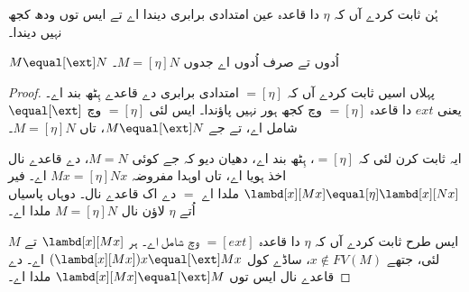 \documentclass[../../../include/open-logic-section]{subfiles}
\begin{document}
ہُن ثابت کردے آں کہ $\eta$ دا قاعدہ عین امتدادی برابری
دیندا اے تے ایس توں ودھ کجھ نہیں دیندا۔

\begin{thm}
  $M \equal[\ext] N$ اُدوں تے صرف اُدوں اے جدوں $M \equal[\eta] N$۔
\end{thm}

\begin{proof}
  پہلاں اسیں ثابت کردے آں کہ $\equal[\eta]$ امتدادی برابری
  دے قاعدے ہِٹھ بند اے۔ یعنی $ext$ دا قاعدہ $\equal[\eta]$ وچ
  کجھ ہور نہیں پاؤندا۔ ایس لئی $\equal[\eta]$ وچ $\equal[\ext]$
  شامل اے، تے جے $M \equal[\ext] N$، تاں $M \equal[\eta] N$۔

  ایہ ثابت کرن لئی کہ $\equal[\eta]$، \ext ہِٹھ بند اے،
  دھیان دیو کہ جے کوئی $M
  \equal N$، \ext{} دے قاعدے نال اخذ ہویا اے، تاں اوہدا
  مفروضہ $Mx
  \equal[\eta] Nx$ اے۔ فیر $\lambd[x][Mx]
  \equal[\eta] \lambd[x][Nx]$ ملدا اے $\equal$ دے اک قاعدے
  نال۔ دوہاں پاسیاں اُتے $\eta$ لاؤن نال $M \equal[\eta] N$
  ملدا اے۔

  ایس طرح ثابت کردے آں کہ $\eta$ دا قاعدہ $\equal[ext]$ وچ
  شامل اے۔ ہر $\lambd[x][Mx]$ تے $M$ لئی، جتھے $x \notin
  FV(M)$، ساڈے کول $(\lambd[x][Mx])x \equal[\ext] Mx$ اے۔
  \ext{} دے قاعدے نال ایس توں $\lambd[x][Mx] \equal[\ext] M$
  ملدا اے۔
\end{proof}
\end{document}
